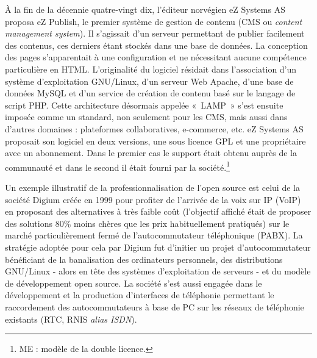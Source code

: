 \documentclass{FramateX}
\begin{document}
\begin{refsection}
À la fin de la décennie quatre-vingt dix, l'éditeur norvégien eZ Systems
AS proposa eZ Publish, le premier système de gestion de contenu (CMS ou
\textit{content management system}). Il s'agissait d'un serveur
permettant de publier facilement des contenus, ces derniers étant
stockés dans une base de données. La conception des pages s'apparentait
à une configuration et ne nécessitant aucune compétence particulière en
HTML. L'originalité du logiciel résidait dans
l'association d'un système
d'exploitation GNU/Linux, d'un serveur Web Apache,
d'une base de données MySQL et d'un
service de création de contenu basé sur le langage de script PHP. Cette
architecture désormais appelée «~LAMP~» s'est ensuite imposée comme un
standard, non seulement pour les CMS, mais aussi dans d'autres domaines
: plateformes collaboratives, e-commerce, etc. eZ Systems AS proposait
son logiciel en deux versions, une sous licence GPL et une propriétaire
avec un abonnement. Dans le premier cas le support était obtenu auprès
de la communauté et dans le second il était fourni par la
société.\footnote{ME : modèle de la double licence.}

Un exemple illustratif de la professionnalisation de
l'open source est celui de la société Digium créée en
1999 pour profiter de l'arrivée de la voix sur IP (VoIP) en proposant
des alternatives à très faible coût (l'objectif
affiché était de proposer des solutions 80\% moins chères que les prix
habituellement pratiqués) sur le marché particulièrement fermé de
l'autocommutateur téléphonique (PABX). La stratégie adoptée pour cela
par Digium fut d'initier un projet d'autocommutateur bénéficiant de la
banalisation des ordinateurs personnels, des distributions GNU/Linux -
alors en tête des systèmes d'exploitation de serveurs - et du modèle de
développement open source. La société s'est aussi engagée dans le
développement et la production d'interfaces de téléphonie permettant le
raccordement des autocommutateurs à base de PC sur les réseaux de
téléphonie existants (RTC, RNIS \textit{alias ISDN}).


\end{refsection}
\end{document}
